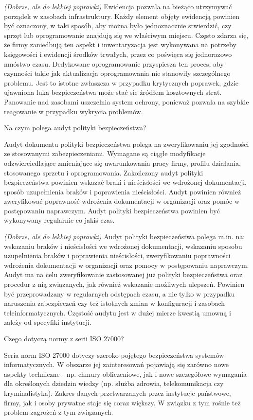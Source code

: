 \documentclass[answers,11pt]{exam}
\newcommand{\fixit}{\textit{(Dobrze, ale do lekkiej poprawki)} }
\begin{document}
\begin{questions}
\begin{solution}
\fixit
Ewidencja pozwala na bieżąco utrzymywać porządek w zasobach infrastruktury. Każdy element objęty ewidencją powinien być oznaczony, w taki sposób, aby można było jednoznacznie stwierdzić, czy sprzęt lub oprogramowanie znajdują się we właściwym miejscu. Często zdarza się, że firmy zaniedbują ten aspekt i inwentaryzacja jest wykonywana na potrzeby księgowości i ewidencji środków trwałych, przez co poświęca się jednorazowo mnóstwo czasu. Dedykowane oprogramowanie przyspiesza ten proces, aby czynności takie jak aktualizacja oprogramowania nie stanowiły szczególnego problemu. Jest to istotne zwłaszcza w przypadku krytycznych poprawek, gdzie ujawniona luka bezpieczeństwa może stać się źródłem kosztownych strat. Panowanie nad zasobami uszczelnia system ochrony, ponieważ pozwala na szybkie reagowanie w przypadku wykrycia problemów.
\end{solution}

\question Na czym polega audyt polityki bezpieczeństwa?
\begin{solution}
Audyt dokumentu polityki bezpieczeństwa polega na zweryfikowaniu jej zgodności ze stosowanymi zabezpieczeniami. Wymagane są ciągłe modyfikacje odzwierciedlające zmieniające się uwarunkowania pracy firmy, profilu działania, stosowanego sprzetu i oprogramowania. Zakończony audyt polityki bezpieczeństwa powinien wskazać braki i nieścisłości we wdrożonej dokumentacji, sposób uzupełnienia braków i poprawienia nieścisłości. Audyt powinien również zweryfikować poprawność wdrożenia dokumentacji w organizacji oraz pomóc w postępowaniu naprawczym. Audyt polityki bezpieczeństwa powinien być wykonywany regularnie co jakiś czas.

\fixit
Audyt polityki bezpieczeństwa polega m.in. na: wskazaniu braków i nieścisłości we wdrożonej dokumentacji, wskazaniu sposobu uzupełnienia braków i poprawienia nieścisłości, zweryfikowaniu poprawności wdrożenia dokumentacji w organizacji oraz pomocy w postępowaniu naprawczym. Audyt ma na celu zweryfikowanie zastosowanej już polityki bezpieczeństwa oraz procedur z nią związanych, jak również wskazanie możliwych ulepszeń. Powinien być przeprowadzany w regularnych odstępach czasu, a nie tylko w przypadku naruszenia zabezpieczeń czy też istotnych zmian w konfiguracji i zasobach teleinformatycznych. Częstość audytu jest w dużej mierze kwestią umowną i zależy od specyfiki instytucji.
\end{solution}

\question Czego dotyczą normy z serii ISO 27000?
\begin{solution}
Seria norm ISO 27000 dotyczy szeroko pojętego bezpieczeństwa systemów informatycznych. W obszarze jej zainteresowań pojawiają się zarówno nowe aspekty techniczne  - np. chmury obliczeniowe, jak i nowe szczegółowe wymagania dla określonych dziedzin wiedzy (np. służba zdrowia, telekomunikacja czy kryminalistyka). Zakres danych przetwarzanych przez instytucje państwowe, firmy, jak i osoby prywatne staje się coraz większy. W związku z tym rośnie też problem zagrożeń z tym związanych. 
\end{solution}



\end{questions}
\end{document}

